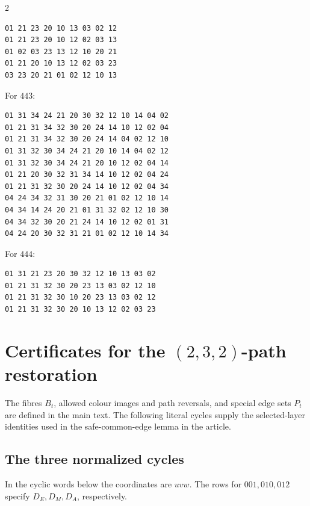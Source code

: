 \documentclass[11pt]{article}
\numberwithin{equation}{section}
\numberwithin{table}{section}
\begin{document}
\begin{multicols}{2}
\begin{minipage}{\linewidth}
\begin{verbatim}
01 21 23 20 10 13 03 02 12
01 21 23 20 10 12 02 03 13
01 02 03 23 13 12 10 20 21
01 21 20 10 13 12 02 03 23
03 23 20 21 01 02 12 10 13
\end{verbatim}
\end{minipage}\par\medskip
\noindent\begin{minipage}{\linewidth}
\noindent For $443$:
\begin{verbatim}
01 31 34 24 21 20 30 32 12 10 14 04 02
01 21 31 34 32 30 20 24 14 10 12 02 04
01 21 31 34 32 30 20 24 14 04 02 12 10
01 31 32 30 34 24 21 20 10 14 04 02 12
01 31 32 30 34 24 21 20 10 12 02 04 14
01 21 20 30 32 31 34 14 10 12 02 04 24
01 21 31 32 30 20 24 14 10 12 02 04 34
04 24 34 32 31 30 20 21 01 02 12 10 14
04 34 14 24 20 21 01 31 32 02 12 10 30
04 34 32 30 20 21 24 14 10 12 02 01 31
04 24 20 30 32 31 21 01 02 12 10 14 34
\end{verbatim}
\end{minipage}\par\medskip
\noindent\begin{minipage}{\linewidth}
\noindent For $444$:
\begin{verbatim}
01 31 21 23 20 30 32 12 10 13 03 02
01 21 31 32 30 20 23 13 03 02 12 10
01 21 31 32 30 10 20 23 13 03 02 12
01 21 31 32 30 20 10 13 12 02 03 23
\end{verbatim}
\end{minipage}\par\medskip

\end{multicols}

\section{Certificates for the \texorpdfstring{$(2,3,2)$}{(2,3,2)}-path restoration}
\label{app:path232-certificates}
The fibres $B_t$, allowed colour images and path reversals, and special
edge sets $P_t$ are defined in the main text. The following literal
cycles supply the selected-layer identities used in
the safe-common-edge lemma in the article.

\subsection{The three normalized cycles}
In the cyclic words below the coordinates are $uvw$. The rows for
$001,010,012$ specify $D_E,D_M,D_A$, respectively.
\end{document}
